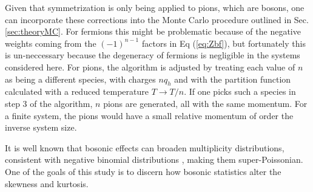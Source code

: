 Given that symmetrization is only being applied to pions, which are bosons, one can incorporate these corrections into the Monte Carlo procedure outlined in Sec. \ref{sec:theoryMC}. For fermions this might be problematic because of the negative weights coming from the $(-1)^{n-1}$ factors in Eq (\ref{eq:Zbf}), but fortunately this is un-neccessary because the degeneracy of fermions is negligible in the systems considered here. For pions, the algorithm is adjusted by treating each value of $n$ as being a different species, with charges $nq_h$ and with the partition function calculated with a reduced temperature $T\rightarrow T/n$. If one picks such a species in step 3 of the algorithm, $n$ pions are generated, all with the same momentum. For a finite system, the pions would have a small relative momentum of order the inverse system size.

It is well known that bosonic effects can broaden multiplicity distributions, consistent with negative binomial distributions \cite{Carruthers:1983my,Carruthers:1989jj}, making them super-Poissonian. One of the goals of this study is to discern how bosonic statistics alter the skewness and kurtosis. 
